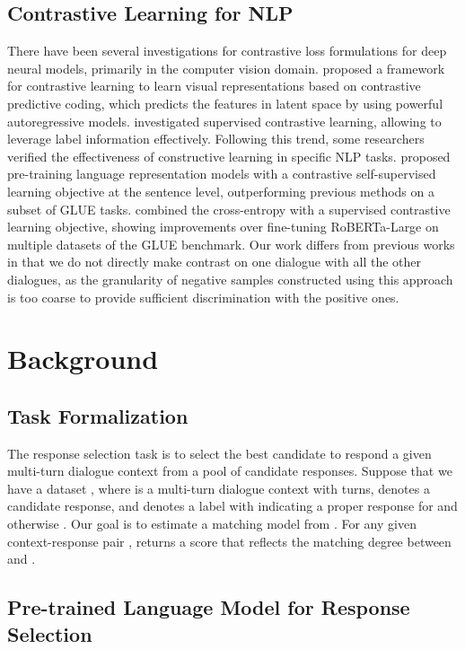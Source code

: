 \documentclass[letterpaper]{article} \usepackage{aaai22}  \usepackage{times}  \usepackage{helvet}  \usepackage{courier}  \usepackage[hyphens]{url}  \usepackage{graphicx} \urlstyle{rm} \def\UrlFont{\rm}  \usepackage{natbib}  \usepackage{caption} \DeclareCaptionStyle{ruled}{labelfont=normalfont,labelsep=colon,strut=off} \frenchspacing  \setlength{\pdfpagewidth}{8.5in}  \setlength{\pdfpageheight}{11in}  \usepackage{algorithm}
\begin{document}
\subsection{Contrastive Learning for NLP}
There have been several investigations for contrastive loss formulations for deep neural models, primarily in the computer vision domain. \citet{oord2018representation} proposed a framework for contrastive learning to learn visual representations based on contrastive predictive coding, which predicts the features in latent space by using powerful autoregressive models. \citet{khosla2020supervised} investigated supervised contrastive learning, allowing to leverage label information effectively. Following this trend, some researchers verified the effectiveness of constructive learning in specific NLP tasks. \citet{fang2020cert} proposed pre-training language representation models with a contrastive self-supervised learning objective at the sentence level, outperforming previous methods on a subset of GLUE tasks. \citet{gunel2020supervised} combined the cross-entropy with a supervised contrastive learning objective, showing improvements over fine-tuning RoBERTa-Large on multiple datasets of the GLUE benchmark. Our work differs from previous works in that we do not directly make contrast on one dialogue with all the other dialogues, as the granularity of negative samples constructed using this approach is too coarse to provide sufficient discrimination with the positive ones.
 \section{Background}

\subsection{Task Formalization}

The response selection task is to select the best candidate to respond a given multi-turn dialogue context from a pool of candidate responses. Suppose that we have a dataset , where  is a multi-turn dialogue context with  turns,  denotes a candidate response, and  denotes a label with  indicating  a proper response for  and otherwise . Our goal is to estimate a matching model  from . For any given context-response pair ,  returns a score that reflects the matching degree between  and .

\subsection{Pre-trained Language Model for Response Selection}
\end{document}
